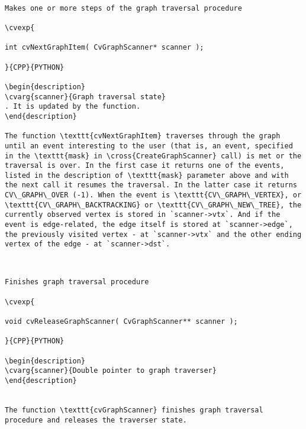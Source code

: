\label{NextGraphItem}
\begin{verbatim}

Makes one or more steps of the graph traversal procedure

\cvexp{

int cvNextGraphItem( CvGraphScanner* scanner );

}{CPP}{PYTHON}

\begin{description}
\cvarg{scanner}{Graph traversal state}
. It is updated by the function.
\end{description}

The function \texttt{cvNextGraphItem} traverses through the graph until an event interesting to the user (that is, an event, specified in the \texttt{mask} in \cross{CreateGraphScanner} call) is met or the traversal is over. In the first case it returns one of the events, listed in the description of \texttt{mask} parameter above and with the next call it resumes the traversal. In the latter case it returns CV\_GRAPH\_OVER (-1). When the event is \texttt{CV\_GRAPH\_VERTEX}, or \texttt{CV\_GRAPH\_BACKTRACKING} or \texttt{CV\_GRAPH\_NEW\_TREE}, the currently observed vertex is stored in `scanner->vtx`. And if the event is edge-related, the edge itself is stored at `scanner->edge`, the previously visited vertex - at `scanner->vtx` and the other ending vertex of the edge - at `scanner->dst`.


\end{verbatim}
\label{ReleaseGraphScanner}
\begin{verbatim}

Finishes graph traversal procedure

\cvexp{

void cvReleaseGraphScanner( CvGraphScanner** scanner );

}{CPP}{PYTHON}

\begin{description}
\cvarg{scanner}{Double pointer to graph traverser}
\end{description}


The function \texttt{cvGraphScanner} finishes graph traversal procedure and releases the traverser state.


\end{verbatim}
